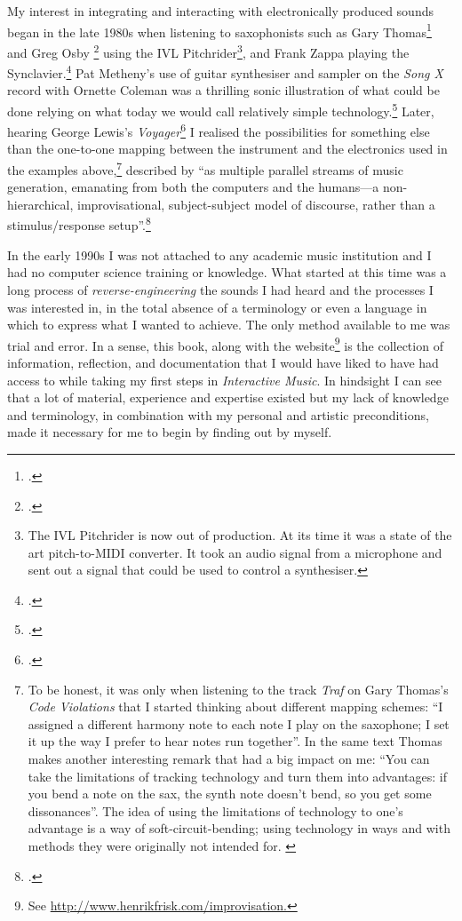 My interest in integrating and interacting with electronically produced sounds began in the late 1980s when listening to saxophonists such as Gary Thomas\footcite{thomas88} and Greg Osby
\footcite{dejohnette88} using the IVL Pitchrider\footnote{The IVL Pitchrider is now out of production. At its time it was a state of the art pitch-to-MIDI converter. It took an audio signal from a microphone and sent out a  signal that could be used to control a synthesiser.}, and Frank Zappa playing the Synclavier.\footcite{zappa86,wiki_synclavier} Pat Metheny's use of guitar synthesiser and sampler on the \emph{Song X} record with Ornette Coleman was a thrilling sonic illustration of what could be done relying on what today we would call relatively simple technology.\footcite{metheny86} Later, hearing George Lewis's \emph{Voyager}\footcite{lewis92} I realised the possibilities for something else than the one-to-one mapping between the instrument and the electronics used in the examples above,\footnote{To be honest, it was only when listening to the track \emph{Traf} on Gary Thomas's \emph{Code Violations} that I started thinking about different mapping schemes: ``I assigned a different harmony note to each note I play on the saxophone; I set it up the way I prefer to hear notes run together''. In the same text Thomas makes another interesting remark that had a big impact on me: ``You can take the limitations of tracking technology and turn them into advantages: if you bend a note on the sax, the synth note doesn't bend, so you get some dissonances''. The idea of using the limitations of technology to one's advantage is a way of soft-circuit-bending; using technology in ways and with methods they were originally not intended for. \cite[See cover notes in][]{thomas88}} \hypertarget{sec:target:personal-background-1}{described by} \citeauthor{lewis00} ``as multiple parallel streams of music generation, emanating from both the computers and the humans---a non-hierarchical, improvisational, subject-subject model of discourse, rather than a stimulus/response setup''.\footcite[34]{lewis00}

In the early 1990s I was not attached to any academic music institution and I had no computer science training or knowledge. What started at this time was a long process of \emph{reverse-engineering} the sounds I had heard and the processes I was interested in, in the total absence of a terminology or even a language in which to express what I wanted to achieve. The only method available to me was trial and error. In a sense, this book, along with the website\footnote{See \url{http://www.henrikfrisk.com/improvisation.}} is the collection of information, reflection, and documentation that I would have liked to have had access to while taking my first steps in \emph{Interactive Music}. In hindsight I can see that a lot of material, experience and expertise existed but my lack of knowledge and terminology, in combination with my personal and artistic preconditions, made it necessary for me to begin by finding out by myself.

